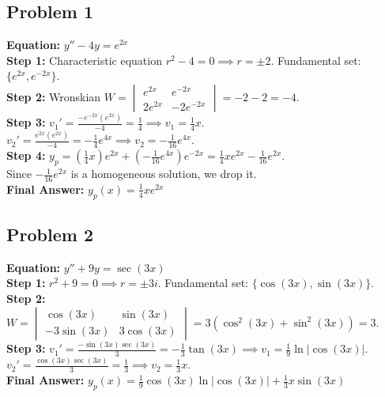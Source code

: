 \documentclass[11pt]{article}
\begin{document}
\subsection*{Problem 1}
\textbf{Equation:} $y'' - 4y = e^{2x}$ \\
\textbf{Step 1:} Characteristic equation $r^2 - 4 = 0 \implies r = \pm 2$. Fundamental set: $\{e^{2x}, e^{-2x}\}$. \\
\textbf{Step 2:} Wronskian $W = \begin{vmatrix} e^{2x} & e^{-2x} \\ 2e^{2x} & -2e^{-2x} \end{vmatrix} = -2 - 2 = -4$. \\
\textbf{Step 3:} $v_1' = \frac{-e^{-2x}(e^{2x})}{-4} = \frac{1}{4} \implies v_1 = \frac{1}{4}x$. \\
$v_2' = \frac{e^{2x}(e^{2x})}{-4} = -\frac{1}{4}e^{4x} \implies v_2 = -\frac{1}{16}e^{4x}$. \\
\textbf{Step 4:} $y_p = (\frac{1}{4}x)e^{2x} + (-\frac{1}{16}e^{4x})e^{-2x} = \frac{1}{4}xe^{2x} - \frac{1}{16}e^{2x}$. \\
Since $-\frac{1}{16}e^{2x}$ is a homogeneous solution, we drop it. \\
\textbf{Final Answer:} $y_p(x) = \frac{1}{4}xe^{2x}$

\subsection*{Problem 2}
\textbf{Equation:} $y'' + 9y = \sec(3x)$ \\
\textbf{Step 1:} $r^2 + 9 = 0 \implies r = \pm 3i$. Fundamental set: $\{\cos(3x), \sin(3x)\}$. \\
\textbf{Step 2:} $W = \begin{vmatrix} \cos(3x) & \sin(3x) \\ -3\sin(3x) & 3\cos(3x) \end{vmatrix} = 3(\cos^2(3x) + \sin^2(3x)) = 3$. \\
\textbf{Step 3:} $v_1' = \frac{-\sin(3x)\sec(3x)}{3} = -\frac{1}{3}\tan(3x) \implies v_1 = \frac{1}{9}\ln|\cos(3x)|$. \\
$v_2' = \frac{\cos(3x)\sec(3x)}{3} = \frac{1}{3} \implies v_2 = \frac{1}{3}x$. \\
\textbf{Final Answer:} $y_p(x) = \frac{1}{9}\cos(3x)\ln|\cos(3x)| + \frac{1}{3}x\sin(3x)$
\end{document}
